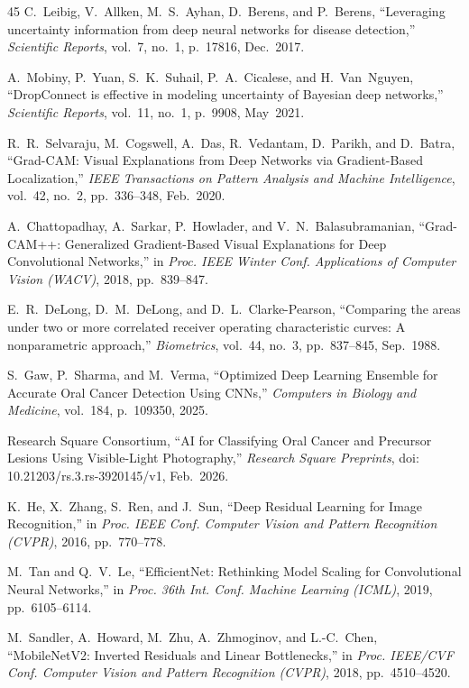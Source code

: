 \documentclass[12pt,a4paper,oneside]{report}
\begin{document}
\begin{thebibliography}{45}
C.~Leibig, V.~Allken, M.~S.~Ayhan, D.~Berens, and P.~Berens, ``Leveraging uncertainty information from deep neural networks for disease detection,'' \textit{Scientific Reports}, vol.~7, no.~1, p.~17816, Dec.~2017.

A.~Mobiny, P.~Yuan, S.~K.~Suhail, P.~A.~Cicalese, and H.~Van~Nguyen, ``DropConnect is effective in modeling uncertainty of Bayesian deep networks,'' \textit{Scientific Reports}, vol.~11, no.~1, p.~9908, May~2021.

R.~R.~Selvaraju, M.~Cogswell, A.~Das, R.~Vedantam, D.~Parikh, and D.~Batra, ``Grad-CAM: Visual Explanations from Deep Networks via Gradient-Based Localization,'' \textit{IEEE Transactions on Pattern Analysis and Machine Intelligence}, vol.~42, no.~2, pp.~336--348, Feb.~2020.

A.~Chattopadhay, A.~Sarkar, P.~Howlader, and V.~N.~Balasubramanian, ``Grad-CAM++: Generalized Gradient-Based Visual Explanations for Deep Convolutional Networks,'' in \textit{Proc. IEEE Winter Conf. Applications of Computer Vision (WACV)}, 2018, pp.~839--847.

E.~R.~DeLong, D.~M.~DeLong, and D.~L.~Clarke-Pearson, ``Comparing the areas under two or more correlated receiver operating characteristic curves: A nonparametric approach,'' \textit{Biometrics}, vol.~44, no.~3, pp.~837--845, Sep.~1988.

S.~Gaw, P.~Sharma, and M.~Verma, ``Optimized Deep Learning Ensemble for Accurate Oral Cancer Detection Using CNNs,'' \textit{Computers in Biology and Medicine}, vol.~184, p.~109350, 2025.

Research Square Consortium, ``AI for Classifying Oral Cancer and Precursor Lesions Using Visible-Light Photography,'' \textit{Research Square Preprints}, doi: 10.21203/rs.3.rs-3920145/v1, Feb.~2026.

K.~He, X.~Zhang, S.~Ren, and J.~Sun, ``Deep Residual Learning for Image Recognition,'' in \textit{Proc. IEEE Conf. Computer Vision and Pattern Recognition (CVPR)}, 2016, pp.~770--778.

M.~Tan and Q.~V.~Le, ``EfficientNet: Rethinking Model Scaling for Convolutional Neural Networks,'' in \textit{Proc. 36th Int. Conf. Machine Learning (ICML)}, 2019, pp.~6105--6114.

M.~Sandler, A.~Howard, M.~Zhu, A.~Zhmoginov, and L.-C.~Chen, ``MobileNetV2: Inverted Residuals and Linear Bottlenecks,'' in \textit{Proc. IEEE/CVF Conf. Computer Vision and Pattern Recognition (CVPR)}, 2018, pp.~4510--4520.


\end{thebibliography}
\end{document}
